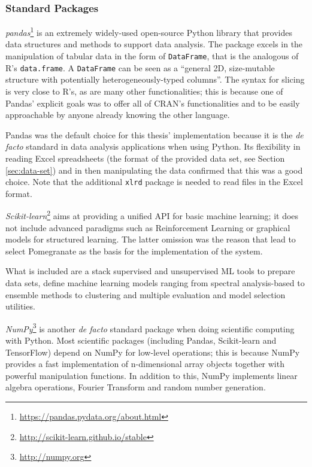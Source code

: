 \subsubsection{Standard Packages}
\textit{pandas}\footnote{\url{https://pandas.pydata.org/about.html}} is an extremely widely-used open-source Python library that provides data structures and methods to support data analysis.
The package excels in the manipulation of tabular data in the form of \texttt{DataFrame}, that is the analogous of R's \texttt{data.frame}.
A \texttt{DataFrame} can be seen as a \enquote{general 2D, size-mutable structure with potentially heterogeneously-typed columns}.
The syntax for slicing is very close to R's, as are many other functionalities; this is because one of Pandas' explicit goals was to offer all of CRAN's functionalities and to be easily approachable by anyone already knowing the other language.

Pandas was the default choice for this thesis' implementation because it is the \textit{de facto} standard in data analysis applications when using Python.
Its flexibility in reading Excel spreadsheets (the format of the provided data set, see Section \ref{sec:data-set}) and in then manipulating the data confirmed that this was a good choice.
Note that the additional \texttt{xlrd} package is needed to read files in the Excel format.

\textit{Scikit-learn}\footnote{\url{http://scikit-learn.github.io/stable}} aims at providing a unified API for basic machine learning; it does not include advanced paradigms such as Reinforcement Learning or graphical models for structured learning.
The latter omission was the reason that lead to select Pomegranate as the basis for the implementation of the system.

What is included are a stack supervised and unsupervised ML tools to prepare data sets, define machine learning models ranging from spectral analysis-based to ensemble methods to clustering and multiple evaluation and model selection utilities.

\textit{NumPy}\footnote{\url{http://numpy.org}} is another \textit{de facto} standard package when doing scientific computing with Python.
Most scientific packages (including Pandas, Scikit-learn and TensorFlow) depend on NumPy for low-level operations; this is because NumPy provides a fast implementation of n-dimensional array objects together with powerful manipulation functions.
In addition to this, NumPy implements linear algebra operations, Fourier Transform and random number generation.

